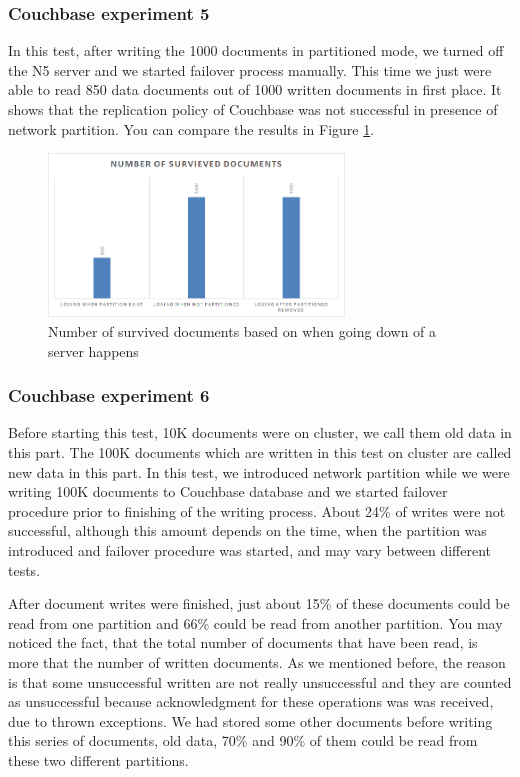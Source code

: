 \documentclass[a4paper]{article}
\begin{document}
\subsubsection{Couchbase experiment 5}
In this test, after writing the 1000 documents in partitioned mode, we turned off the N5 server and we started failover process manually.
This time we just were able to read 850 data documents out of 1000 written documents in first place. 
It shows that the replication policy of Couchbase was not successful in presence of network partition.
You can compare the results in Figure \ref{fig:diagram6}.
\begin{figure}[h!]
	\centering
	\includegraphics[width=0.7\textwidth]{diagram6}
	\caption{Number of survived documents based on when going down of a server happens}
	\label{fig:diagram6}
\end{figure}

\subsubsection{Couchbase experiment 6}
Before starting this test, 10K documents were on cluster, we call them old data in this part.
The 100K documents which are written in this test on cluster are called new data in this part. 
In this test, we introduced network partition while we were writing 100K documents to Couchbase database and we started failover procedure prior to finishing of the writing process. 
About 24\% of writes were not successful, although this amount depends on the time, when the partition was introduced and failover procedure was started, and may vary between different tests.

After document writes were finished, just about 15\% of these documents could be read from one partition and 66\% could be read from another partition.
You may noticed the fact, that the total number of documents that have been read, is more that the number of written documents.
As we mentioned before, the reason is that some unsuccessful written are not really unsuccessful and they are counted as unsuccessful because acknowledgment for these operations was was received, due to thrown exceptions. 
We had stored some other documents before writing this series of documents, old data, 70\% and 90\% of them could be read from these two different partitions.
\end{document}
